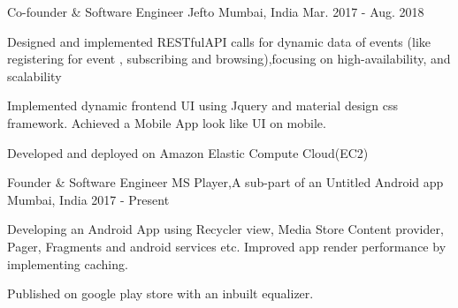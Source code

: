 

\begin{cventries}
  
  \cventry
    {Co-founder \& Software Engineer} %
    {Jefto} %
    {Mumbai, India} %
    {Mar. 2017 - Aug. 2018} %
    {
      \begin{cvitems} %
        \item {Designed and implemented RESTful\-API calls for dynamic data of events (like registering for event , subscribing and browsing),focusing on high-availability, and scalability }
        \item {Implemented dynamic frontend UI using Jquery and material design css framework. Achieved a Mobile App look  like UI on mobile.   }
        \item {Developed  and deployed on Amazon Elastic Compute Cloud(EC2) }
      \end{cvitems}
    }

\end{cventries}



\begin{cventries}

  \cventry
    {Founder \& Software Engineer} %
    {MS Player,A sub-part of an Untitled Android app} %
    {Mumbai, India} %
    { 2017 - Present} %
    {
      \begin{cvitems} %
        \item {Developing an Android App using Recycler view, Media Store Content provider, Pager, Fragments and android services etc. Improved app render performance by implementing caching. }
        \item {Published on google play store with an inbuilt equalizer. }
      \end{cvitems}
    }


\end{cventries}
